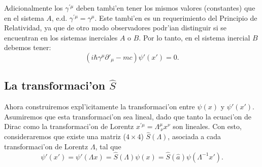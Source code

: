 Adicionalmente los $\gamma^{\prime\mu}$ deben tambi'en tener los mismos
valores (constantes) que en el sistema $A$, e.d. $\gamma^{\prime
\mu}=\gamma^\mu$. Este tambi'en es un
requerimiento del Principio de Relatividad, ya que de otro modo
observadores podr'ian distinguir si se encuentran en los sistemas inerciales 
$A$ o $B$.
Por lo tanto, en el sistema inercial $B$ debemos tener:
\begin{equation}
\left( i\hbar \gamma^{\mu }\partial'_\mu-mc\right) \psi' (x') =0. 
\label{diracprima}
\end{equation}

\subsection{La transformaci'on $\hat{S}$}

Ahora construiremos expl'icitamente la transformaci'on entre $\psi(x) $ y
$\psi' (x') $. Asumiremos que esta transformaci'on
sea lineal, dado que tanto la ecuaci'on de Dirac como la transformaci'on de
Lorentz $x^{\prime \mu }=\Lambda^{\mu}_{\ \nu}x^\nu $ son lineales. Con esto,
consideraremos que existe una matriz ($4\times 4$) $\hat{S}(\Lambda)$, asociada
a cada transformaci'on de Lorentz $\Lambda$, tal que
\begin{equation}
\psi' (x') =\psi' (\Lambda x)
=\hat{S}(\Lambda) \psi (x) =\hat{S}(\hat{a}) \psi \left(
\Lambda^{-1}x' \right) . \label{psi'}
\end{equation}
 
